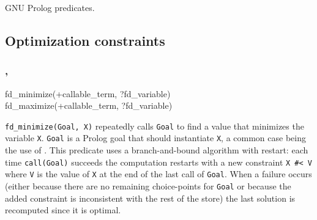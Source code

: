 \begin{PlErrors}







\end{PlErrors}

\Portability

GNU Prolog predicates.

\subsection{Optimization constraints}

\subsubsection{,
               }

\begin{TemplatesOneCol}
fd\_minimize(+callable\_term, ?fd\_variable)\\
fd\_maximize(+callable\_term, ?fd\_variable)

\end{TemplatesOneCol}

\Description

\texttt{fd\_minimize(Goal, X)} repeatedly calls \texttt{Goal} to find a
value that minimizes the variable \texttt{X}. \texttt{Goal} is a Prolog goal
that should instantiate \texttt{X}, a common case being the use of
 . This predicate uses a
branch-and-bound algorithm with restart: each time \texttt{call(Goal)}
succeeds the computation restarts with a new constraint \texttt{X \#< V}
where \texttt{V} is the value of \texttt{X} at the end of the last call of
\texttt{Goal}. When a failure occurs (either because there are no remaining
choice-points for \texttt{Goal} or because the added constraint is
inconsistent with the rest of the store) the last solution is recomputed
since it is optimal.

